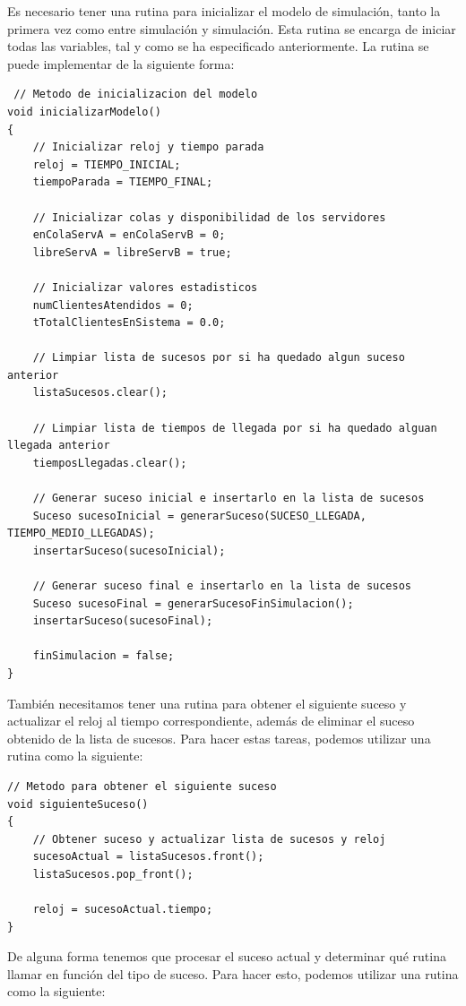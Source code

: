 \documentclass[11pt,a4paper]{article}
\begin{document}
Es necesario tener una rutina para inicializar el modelo de simulación, tanto la primera vez como
entre simulación y simulación. Esta rutina se encarga de iniciar todas las variables, tal y como
se ha especificado anteriormente. La rutina se puede implementar de la siguiente forma:

\begin{lstlisting}
 // Metodo de inicializacion del modelo
void inicializarModelo()
{
	// Inicializar reloj y tiempo parada
    reloj = TIEMPO_INICIAL;
    tiempoParada = TIEMPO_FINAL;

    // Inicializar colas y disponibilidad de los servidores
    enColaServA = enColaServB = 0;
    libreServA = libreServB = true;

    // Inicializar valores estadisticos
    numClientesAtendidos = 0;
    tTotalClientesEnSistema = 0.0;

    // Limpiar lista de sucesos por si ha quedado algun suceso anterior
    listaSucesos.clear();

    // Limpiar lista de tiempos de llegada por si ha quedado alguan llegada anterior
    tiemposLlegadas.clear();

    // Generar suceso inicial e insertarlo en la lista de sucesos
    Suceso sucesoInicial = generarSuceso(SUCESO_LLEGADA, TIEMPO_MEDIO_LLEGADAS);
    insertarSuceso(sucesoInicial);

    // Generar suceso final e insertarlo en la lista de sucesos
    Suceso sucesoFinal = generarSucesoFinSimulacion();
    insertarSuceso(sucesoFinal);

    finSimulacion = false;
}
\end{lstlisting}

También necesitamos tener una rutina para obtener el siguiente suceso y actualizar
el reloj al tiempo correspondiente, además de eliminar el suceso obtenido de la lista
de sucesos. Para hacer estas tareas, podemos utilizar una rutina como la siguiente:

\begin{lstlisting}
// Metodo para obtener el siguiente suceso
void siguienteSuceso()
{
	// Obtener suceso y actualizar lista de sucesos y reloj
    sucesoActual = listaSucesos.front();
    listaSucesos.pop_front();

    reloj = sucesoActual.tiempo;
}
\end{lstlisting}

De alguna forma tenemos que procesar el suceso actual y determinar qué rutina llamar
en función del tipo de suceso. Para hacer esto, podemos utilizar una rutina como la siguiente:
\end{document}
